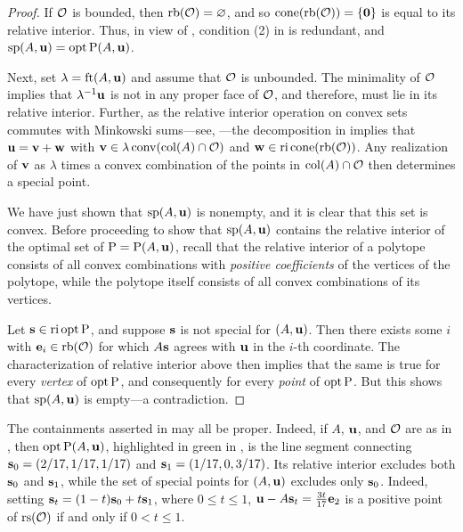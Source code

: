 \documentclass{amsart}
\begin{document}
\begin{proof}
   If $\mathcal{O}$ is bounded, then $\operatorname{rb}(\mathcal{O}) = \varnothing$, and so $\operatorname{cone}( \operatorname{rb}(\mathcal{O})) = \{\mathbf{0} \}$ is equal to its relative interior.
   Thus, in view of , condition (2) in  is redundant, and $\operatorname{sp}(A, \mathbf{u}) = \operatorname{opt} \mathrm{P}(A, \mathbf{u})$.

   Next, set $\lambda = \operatorname{ft}(A, \mathbf{u})$ and assume that $\mathcal{O}$ is unbounded.
   The minimality of $\mathcal{O}$ implies that $\lambda^{-1}\mathbf{u}$ is not in any proper face of $\mathcal{O}$, and therefore, must lie in its relative interior.  Further, as the relative interior operation on convex sets commutes with Minkowski sums---see, \eg \cite[Theorem 4.10(b)]{vantiel.convex_analysis}---the decomposition in   implies that $\mathbf{u} = \mathbf{v} + \mathbf{w}$ with $\mathbf{v} \in \lambda \operatorname{conv}(\operatorname{col}(A) \cap \mathcal{O})$ and $\mathbf{w} \in \operatorname{ri} \operatorname{cone}(\operatorname{rb}(\mathcal{O}))$.  Any realization of $\mathbf{v}$ as $\lambda$ times a convex combination of the points in $\operatorname{col}(A) \cap \mathcal{O}$ then determines a special point.

 We have just shown that $\operatorname{sp}(A, \mathbf{u})$ is nonempty, and it is clear that this set is convex.
 Before proceeding to show that $\operatorname{sp}(A, \mathbf{u})$ contains the relative interior of the optimal set of $\mathrm{P} = \mathrm{P}(A,\mathbf{u})$,
  recall that the relative interior of a polytope consists of all convex combinations with \emph{positive coefficients} of the vertices of the polytope, while the polytope itself consists of all convex combinations of its vertices.

  Let $\mathbf{s} \in \operatorname{ri} \operatorname{opt} \mathrm{P}$, and suppose $\mathbf{s}$ is not special for $(A,\mathbf{u})$.
  Then there exists some $i$ with $\mathbf{e}_i \in \operatorname{rb}(\mathcal{O})$ for which $A\mathbf{s}$ agrees with $\mathbf{u}$ in the $i$-th coordinate.
  The characterization of relative interior above then implies that the same is true for every \emph{vertex} of $\operatorname{opt} \mathrm{P}$, and consequently for every \emph{point} of $\operatorname{opt} \mathrm{P}$.
  But this shows that $\operatorname{sp}(A,\mathbf{u})$ is empty---a contradiction.
\end{proof}

\begin{example}
   \label{ex: ft.1}
   The containments asserted in  may all be proper.
   Indeed, if $A$, $\mathbf{u}$, and $\mathcal{O}$ are as in , then $\operatorname{opt} \mathrm{P}(A,\mathbf{u})$, highlighted in green in , is the line segment connecting $\mathbf{s}_0 = (2/17, 1/17, 1/17)$ and $\mathbf{s}_1 = (1/17, 0, 3/17)$.
   Its relative interior excludes both $\mathbf{s}_0$ and $\mathbf{s}_1$, while the set of special points for $(A,\mathbf{u})$ excludes only $\mathbf{s}_0$.
   Indeed, setting $\mathbf{s}_t=(1-t)\mathbf{s}_0 + t \mathbf{s}_1$, where $0\le t\le 1$, $\mathbf{u} - A\mathbf{s}_t = \frac{3t}{17}\mathbf{e}_2$ is a positive point of $\operatorname{rs}(\mathcal{O})$ if and only if $0<t\le 1$.
\end{example}
\end{document}
